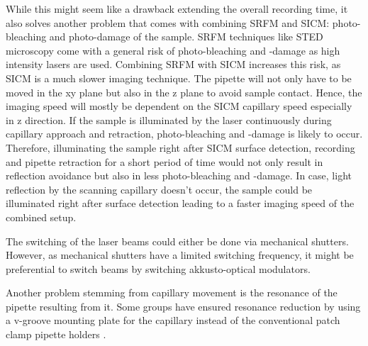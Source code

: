 While this might seem like a drawback extending the overall recording time, it
also solves another problem that comes with combining SRFM and SICM:
photo-bleaching and photo-damage of the sample. SRFM techniques like STED
microscopy come with a general risk of photo-bleaching and -damage as high
intensity lasers are used. Combining SRFM with SICM increases this risk,
as SICM is a much slower imaging technique. The pipette will not only have to
be moved in the xy plane but also in the z plane to avoid sample
contact. Hence, the imaging speed will mostly be dependent on the SICM
capillary speed especially in z direction. If the sample is illuminated by the
laser continuously during capillary approach and retraction, photo-bleaching
and -damage is likely to occur. Therefore, illuminating the sample right after
SICM surface detection, recording and pipette retraction for a short period of
time would not only result in reflection avoidance but also in less
photo-bleaching and -damage. In case, light reflection by the scanning
capillary doesn't occur, the sample could be illuminated right after surface
detection leading to a faster imaging speed of the combined setup.

The switching of the laser beams could either be done via mechanical
shutters. However, as mechanical shutters have a limited switching frequency,
it might be preferential to switch beams by switching akkusto-optical modulators.

Another problem stemming from capillary movement is the resonance of the
pipette resulting from it. Some groups have ensured resonance reduction by
using a v-groove mounting plate for the capillary instead of the conventional
patch clamp pipette holders \cite{Shevchuk2013}.

 	

